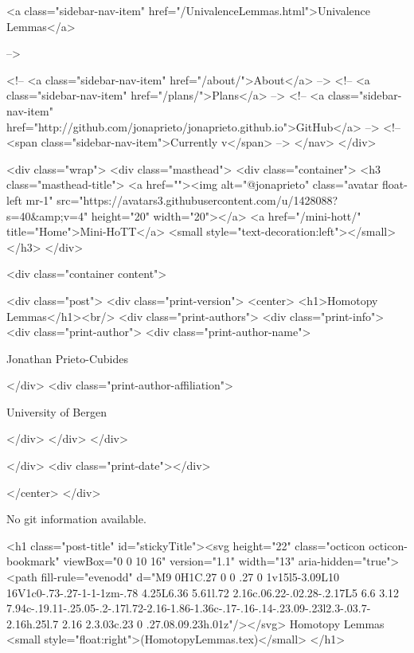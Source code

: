       
    
      
        
          <a class="sidebar-nav-item" href="/UnivalenceLemmas.html">Univalence Lemmas</a>
        
      
     -->

    <!-- <a class="sidebar-nav-item" href="/about/">About</a> -->
    <!-- <a class="sidebar-nav-item" href="/plans/">Plans</a> -->
    <!-- <a class="sidebar-nav-item" href="http://github.com/jonaprieto/jonaprieto.github.io">GitHub</a> -->
    <!-- <span class="sidebar-nav-item">Currently v</span> -->
  </nav>
</div>

    <div class="wrap">
      <div class="masthead">
        <div class="container">
          <h3 class="masthead-title">
            <a href=""><img alt="@jonaprieto" class="avatar float-left mr-1" src="https://avatars3.githubusercontent.com/u/1428088?s=40&amp;v=4" height="20" width="20"></a>
            <a href="/mini-hott/" title="Home">Mini-HoTT</a>
            <small style="text-decoration:left"></small>
          </h3>
        </div>
      
      <div class="container content">
        







<div class="post">
  <div class="print-version">
    <center>
      <h1>Homotopy Lemmas</h1><br/>
        <div class="print-authors">
          <div class="print-info">
            <div class="print-author">
              <div class="print-author-name">
                
                  Jonathan Prieto-Cubides
                
              </div>
              <div class="print-author-affiliation">
                
                  University of Bergen
                
                </div>
            </div>
          </div>
          
          
        </div>
        <div class="print-date"></div>
        
        
    </center>
  </div>

  
  No git information available.
  

  <h1 class="post-title" id="stickyTitle"><svg height="22" class="octicon octicon-bookmark" viewBox="0 0 10 16" version="1.1" width="13" aria-hidden="true"><path fill-rule="evenodd" d="M9 0H1C.27 0 0 .27 0 1v15l5-3.09L10 16V1c0-.73-.27-1-1-1zm-.78 4.25L6.36 5.61l.72 2.16c.06.22-.02.28-.2.17L5 6.6 3.12 7.94c-.19.11-.25.05-.2-.17l.72-2.16-1.86-1.36c-.17-.16-.14-.23.09-.23l2.3-.03.7-2.16h.25l.7 2.16 2.3.03c.23 0 .27.08.09.23h.01z"/></svg> Homotopy Lemmas <small style="float:right">(HomotopyLemmas.tex)</small>
  </h1>

